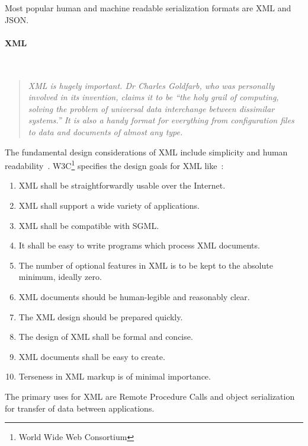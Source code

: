 Most popular human and machine readable serialization formats are XML and JSON.

\paragraph{XML} ~\\
\begin{quotation}
\textit{
XML is hugely important. Dr Charles Goldfarb, who was personally involved in its
invention, claims it to be “the holy grail of computing, solving the problem of universal data interchange between dissimilar systems.” It is also a handy format for everything from configuration files to data and documents of almost any type.
~\cite{xml_intro}}
\end{quotation} 

The fundamental design considerations of XML include
simplicity and human readability~\cite{NurseitovPRI09}.
W3C\footnote{World Wide Web Consortium} specifies the design goals for XML
like~\cite{w3c_xml}:
\begin{enumerate}
  \item XML shall be straightforwardly usable over the Internet.
  \item XML shall support a wide variety of applications.
  \item XML shall be compatible with SGML\footnotemark.
  \item It shall be easy to write programs which process XML documents.
  \item The number of optional features in XML is to be kept to the absolute minimum, ideally zero.
  \item XML documents should be human-legible and reasonably clear.
  \item The XML design should be prepared quickly.
  \item The design of XML shall be formal and concise.
  \item XML documents shall be easy to create.
  \item Terseness in XML markup is of minimal importance.  
\end{enumerate}

The primary uses for XML are Remote Procedure Calls and object serialization for transfer of
data between applications. 

